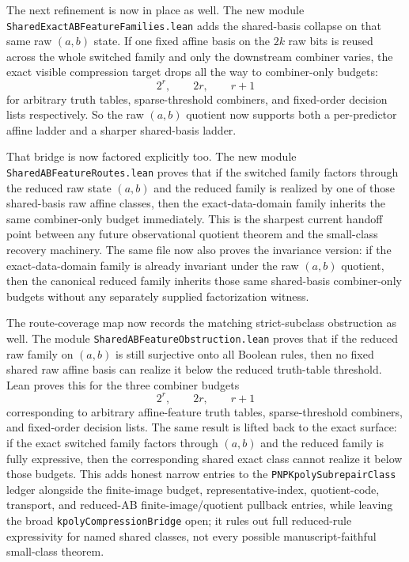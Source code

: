 \documentclass[11pt]{article}
\theoremstyle{remark}
\begin{document}
The next refinement is now in place as well.  The new module
\texttt{SharedExactABFeatureFamilies.lean} adds the shared-basis collapse on
that same raw \((a,b)\) state.  If one fixed affine basis on the \(2k\) raw
bits is reused across the whole switched family and only the downstream
combiner varies, the exact visible compression target drops all the way to
combiner-only budgets:
\[
  2^r, \qquad 2r, \qquad r+1
\]
for arbitrary truth tables, sparse-threshold combiners, and fixed-order
decision lists respectively.  So the raw \((a,b)\) quotient now supports both a
per-predictor affine ladder and a sharper shared-basis ladder.

That bridge is now factored explicitly too.  The new module
\texttt{SharedABFeatureRoutes.lean} proves that if the switched family factors
through the reduced raw state \((a,b)\) and the reduced family is realized by
one of those shared-basis raw affine classes, then the exact-data-domain family
inherits the same combiner-only budget immediately.  This is the sharpest
current handoff point between any future observational quotient theorem and the
small-class recovery machinery.  The same file now also proves the invariance
version: if the exact-data-domain family is already invariant under the raw
\((a,b)\) quotient, then the canonical reduced family inherits those same
shared-basis combiner-only budgets without any separately supplied
factorization witness.

The route-coverage map now records the matching strict-subclass obstruction as
well.  The module \texttt{SharedABFeatureObstruction.lean} proves that if the
reduced raw family on \((a,b)\) is still surjective onto all Boolean rules,
then no fixed shared raw affine basis can realize it below the reduced
truth-table threshold.  Lean proves this for the three combiner budgets
\[
  2^r, \qquad 2r, \qquad r+1
\]
corresponding to arbitrary affine-feature truth tables, sparse-threshold
combiners, and fixed-order decision lists.  The same result is lifted back to
the exact surface: if the exact switched family factors through \((a,b)\) and
the reduced family is fully expressive, then the corresponding shared exact
class cannot realize it below those budgets.  This adds honest narrow entries
to the \texttt{PNPKpolySubrepairClass} ledger alongside the finite-image
budget, representative-index, quotient-code, transport, and reduced-AB
finite-image/quotient pullback entries, while leaving the broad
\texttt{kpolyCompressionBridge} open; it
rules out full reduced-rule expressivity for named shared classes, not every
possible manuscript-faithful small-class theorem.
\end{document}
